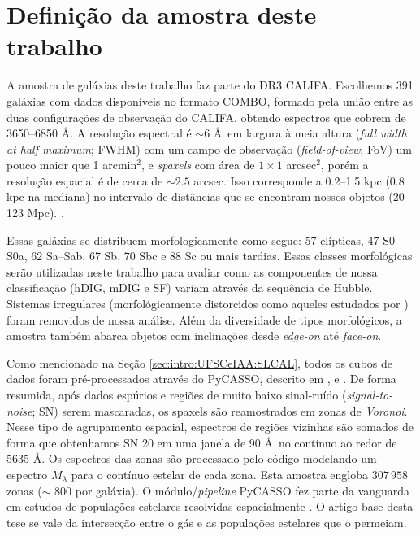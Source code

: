 \section{Definição da amostra deste trabalho}
\label{sec:sample:definicao}

A amostra de galáxias deste trabalho faz parte do DR3 CALIFA. Escolhemos 391 galáxias com dados disponíveis no formato COMBO, formado pela união entre as duas configurações de observação do CALIFA, obtendo espectros que cobrem de 3650--6850 \AA. A resolução espectral é $\sim 6$ \AA\ em largura à meia altura ({\em full width at half maximum}; FWHM) com um campo de observação ({\em field-of-view}; FoV) um pouco maior que 1 arcmin${}^2$, e {\em spaxels} com área de $1 \times 1$ arcsec$^2$, porém a resolução espacial é de cerca de $\sim 2.5$ arcsec. Isso corresponde a 0.2--1.5 kpc (0.8 kpc na mediana) no intervalo de distâncias que se encontram nossos objetos (20--123 Mpc). .

Essas galáxias se distribuem morfologicamente como segue: 57 elípticas, 47 S0--S0a, 62 Sa--Sab, 67 Sb, 70 Sbc e 88 Sc ou mais tardias. Essas classes morfológicas serão utilizadas neste trabalho para avaliar como as componentes de nossa classificação (hDIG, mDIG e SF) variam através da sequência de Hubble. Sistemas irregulares (morfológicamente distorcidos como aqueles estudados por \citealt{Wild.etal.2014, BB.etal.2015b, BB.etal.2015a, CortijoFerrero.etal.2017a, CortijoFerrero.etal.2017b}) foram removidos de nossa análise. Além da diversidade de tipos morfológicos, a amostra também abarca objetos com inclinações desde {\em edge-on} até {\em face-on}.

Como mencionado na Seção \ref{sec:intro:UFSCeIAA:SLCAL}, todos os cubos de dados foram pré-processados através do PyCASSO, descrito em \citet{CidFernandes.etal.2013a}, \citet{CidFernandes.etal.2014a} e \citet{deAmorim.etal.2017}. De forma resumida, após dados espúrios e regiões de muito baixo sinal-ruído ({\em signal-to-noise}; SN) serem mascaradas, os spaxels são reamostrados em zonas de {\em Voronoi}. Nesse tipo de agrupamento espacial, espectros de regiões vizinhas são somados de forma que obtenhamos SN 20 em uma janela de 90 \AA\ no contínuo ao redor de 5635 \AA. Os espectros das zonas são processado pelo código \starlight \citep{CidFernandes.etal.2005a} modelando um espectro $M_\lambda$ para o contínuo estelar de cada zona. Esta amostra engloba $307\,958$ zonas ($\sim$ 800 por galáxia). O módulo/{\em pipeline} PyCASSO fez parte da vanguarda em estudos de populações estelares resolvidas espacialmente \citep{Perez.etal.2013, GonzalezDelgado.etal.2014b, GonzalezDelgado.etal.2015a, GonzalezDelgado.etal.2016a, GonzalezDelgado.etal.2017}. O artigo base desta tese se vale da intersecção entre o gás e as populações estelares que o permeiam.

